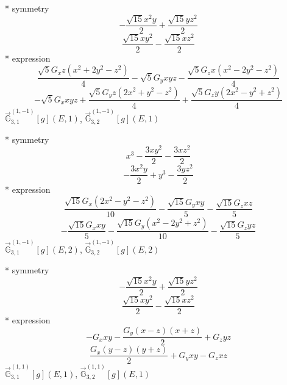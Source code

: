 \documentclass[fleqn,8pt]{jsarticle}
\begin{document}
\noindent\quad ** symmetry
\begin{dmath*}
- \frac{\sqrt{15} x^{2} y}{2} + \frac{\sqrt{15} y z^{2}}{2}
\end{dmath*}
\begin{dmath*}
\frac{\sqrt{15} x y^{2}}{2} - \frac{\sqrt{15} x z^{2}}{2}
\end{dmath*}
\noindent\quad ** expression
\begin{dmath*}
\frac{\sqrt{5} G_{x} z \left(x^{2} + 2 y^{2} - z^{2}\right)}{4} - \sqrt{5} G_{y} x y z - \frac{\sqrt{5} G_{z} x \left(x^{2} - 2 y^{2} - z^{2}\right)}{4}
\end{dmath*}
\begin{dmath*}
- \sqrt{5} G_{x} x y z + \frac{\sqrt{5} G_{y} z \left(2 x^{2} + y^{2} - z^{2}\right)}{4} + \frac{\sqrt{5} G_{z} y \left(2 x^{2} - y^{2} + z^{2}\right)}{4}
\end{dmath*}
\noindent\quad $\vec{\mathbb{G}}_{3,1}^{(1,-1)}[g](E,1)$, $\vec{\mathbb{G}}_{3,2}^{(1,-1)}[g](E,1)$

\noindent\quad ** symmetry
\begin{dmath*}
x^{3} - \frac{3 x y^{2}}{2} - \frac{3 x z^{2}}{2}
\end{dmath*}
\begin{dmath*}
- \frac{3 x^{2} y}{2} + y^{3} - \frac{3 y z^{2}}{2}
\end{dmath*}
\noindent\quad ** expression
\begin{dmath*}
\frac{\sqrt{15} G_{x} \left(2 x^{2} - y^{2} - z^{2}\right)}{10} - \frac{\sqrt{15} G_{y} x y}{5} - \frac{\sqrt{15} G_{z} x z}{5}
\end{dmath*}
\begin{dmath*}
- \frac{\sqrt{15} G_{x} x y}{5} - \frac{\sqrt{15} G_{y} \left(x^{2} - 2 y^{2} + z^{2}\right)}{10} - \frac{\sqrt{15} G_{z} y z}{5}
\end{dmath*}
\noindent\quad $\vec{\mathbb{G}}_{3,1}^{(1,-1)}[g](E,2)$, $\vec{\mathbb{G}}_{3,2}^{(1,-1)}[g](E,2)$

\noindent\quad ** symmetry
\begin{dmath*}
- \frac{\sqrt{15} x^{2} y}{2} + \frac{\sqrt{15} y z^{2}}{2}
\end{dmath*}
\begin{dmath*}
\frac{\sqrt{15} x y^{2}}{2} - \frac{\sqrt{15} x z^{2}}{2}
\end{dmath*}
\noindent\quad ** expression
\begin{dmath*}
- G_{x} x y - \frac{G_{y} \left(x - z\right) \left(x + z\right)}{2} + G_{z} y z
\end{dmath*}
\begin{dmath*}
\frac{G_{x} \left(y - z\right) \left(y + z\right)}{2} + G_{y} x y - G_{z} x z
\end{dmath*}
\noindent\quad $\vec{\mathbb{G}}_{3,1}^{(1,1)}[g](E,1)$, $\vec{\mathbb{G}}_{3,2}^{(1,1)}[g](E,1)$
\end{document}

